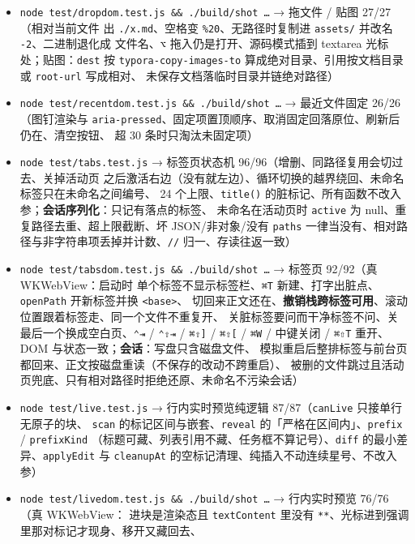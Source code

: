 \documentclass[11pt,a4paper]{ctexart}
\begin{document}
\begin{itemize}
两条路径各自抠出绝对路径、\texttt{file://} 剥离与百分号解码、目录/相对/URL 被丢掉、
三档退化的判定、空格与圆括号转义、标签里 \texttt{[]\textbackslash{}} 转义）
\item \texttt{node test/dropdom.test.js \&\& ./build/shot …} → 拖文件 / 贴图 27/27（相对当前文件
出 \texttt{./x.md}、空格变 \texttt{\%20}、无路径时复制进 \texttt{assets/} 并改名 \texttt{-2}、二进制退化成
文件名、\texttt{⌥} 拖入仍是打开、源码模式插到 textarea 光标处；贴图：\texttt{dest} 按
\texttt{typora-copy-images-to} 算成绝对目录、引用按文档目录或 \texttt{root-url} 写成相对、
未保存文档落临时目录并链绝对路径）
\item \texttt{node test/recentdom.test.js \&\& ./build/shot …} → 最近文件固定 26/26（图钉渲染与
\texttt{aria-pressed}、固定项置顶顺序、取消固定回落原位、刷新后仍在、清空按钮、
超 30 条时只淘汰未固定项）
\item \texttt{node test/tabs.test.js} → 标签页状态机 96/96（增删、同路径复用会切过去、关掉活动页
之后激活右边（没有就左边）、循环切换的越界绕回、未命名标签只在未命名之间编号、
24 个上限、\texttt{title()} 的脏标记、所有函数不改入参；\textbf{会话序列化}：只记有落点的标签、
未命名在活动页时 \texttt{active} 为 null、重复路径去重、超上限截断、坏 JSON/非对象/没有
\texttt{paths} 一律当没有、相对路径与非字符串项丢掉并计数、\texttt{//} 归一、存读往返一致）
\item \texttt{node test/tabsdom.test.js \&\& ./build/shot …} → 标签页 92/92（真 WKWebView：启动时
单个标签不显示标签栏、\texttt{⌘T} 新建、打字出脏点、\texttt{openPath} 开新标签并换 \texttt{\textless{}base\textgreater{}}、
切回来正文还在、\textbf{撤销栈跨标签可用}、滚动位置跟着标签走、同一个文件不重复开、
关脏标签要问而干净标签不问、关最后一个换成空白页、\texttt{⌃⇥} / \texttt{⌃⇧⇥} / \texttt{⌘⇧]} / \texttt{⌘⇧[} /
\texttt{⌘W} / 中键关闭 / \texttt{⌘⇧T} 重开、DOM 与状态一致；\textbf{会话}：写盘只含磁盘文件、
模拟重启后整排标签与前台页都回来、正文按磁盘重读（不保存的改动不跨重启）、
被删的文件跳过且活动页兜底、只有相对路径时拒绝还原、未命名不污染会话）
\item \texttt{node test/live.test.js} → 行内实时预览纯逻辑 87/87（\texttt{canLive} 只接单行无原子的块、
\texttt{scan} 的标记区间与嵌套、\texttt{reveal} 的「严格在区间内」、\texttt{prefix} / \texttt{prefixKind}
（标题可藏、列表引用不藏、任务框不算记号）、\texttt{diff} 的最小差异、\texttt{applyEdit} 与
\texttt{cleanupAt} 的空标记清理、纯插入不动连续星号、不改入参）
\item \texttt{node test/livedom.test.js \&\& ./build/shot …} → 行内实时预览 76/76（真 WKWebView：
进块是渲染态且 \texttt{textContent} 里没有 \texttt{**}、光标进到强调里那对标记才现身、移开又藏回去、

\end{itemize}
\end{document}
